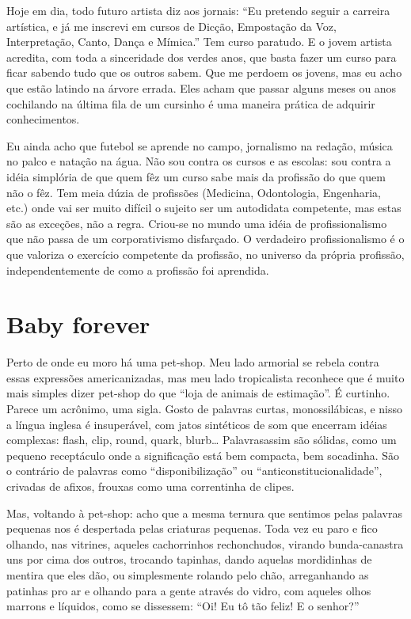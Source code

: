 Hoje em dia, todo futuro artista diz aos jornais: “Eu pretendo seguir
a carreira artística, e já me inscrevi em cursos de Dicção,
Empostação da Voz, Interpretação, Canto, Dança e Mímica.” Tem curso
paratudo. E o jovem artista acredita, com toda a sinceridade dos
verdes anos, que basta fazer um curso para ficar sabendo tudo que os
outros sabem. Que me perdoem os jovens, mas eu acho que estão latindo
na árvore errada. Eles acham que passar alguns meses ou anos
cochilando na última fila de um cursinho é uma maneira prática de
adquirir conhecimentos.

Eu ainda acho que futebol se aprende no campo, jornalismo na redação,
música no palco e natação na água. Não sou contra os cursos e as
escolas: sou contra a idéia simplória de que quem fêz um curso sabe
mais da profissão do que quem não o fêz.  Tem meia dúzia de
profissões (Medicina, Odontologia, Engenharia, etc.) onde vai ser
muito difícil o sujeito ser um autodidata competente, mas estas são
as exceções, não a regra. Criou-se no mundo uma idéia de
profissionalismo que não passa de um corporativismo disfarçado. O
verdadeiro profissionalismo é o que valoriza o exercício competente
da profissão, no universo da própria profissão, independentemente de
como a profissão foi aprendida.

\chapter{Baby forever}

Perto de onde eu moro há uma pet-shop. Meu lado armorial se rebela
contra essas expressões americanizadas, mas meu lado tropicalista
reconhece que é muito mais simples dizer pet-shop do que “loja de
animais de estimação”. É curtinho. Parece um acrônimo, uma sigla.
Gosto de palavras curtas, monossilábicas, e nisso a língua inglesa é
insuperável, com jatos sintéticos de som que encerram idéias
complexas: flash, clip, round, quark, blurb… Palavrasassim são
sólidas, como um pequeno receptáculo onde a significação está bem
compacta, bem socadinha. São o contrário de palavras como
“disponibilização” ou “anticonstitucionalidade”, crivadas de afixos,
frouxas como uma correntinha de clipes.

Mas, voltando à pet-shop: acho que a mesma ternura que sentimos pelas
palavras pequenas nos é despertada pelas criaturas pequenas. Toda vez
eu paro e fico olhando, nas vitrines, aqueles cachorrinhos
rechonchudos, virando bunda-canastra uns por cima dos outros,
trocando tapinhas, dando aquelas mordidinhas de mentira que eles dão,
ou simplesmente rolando pelo chão, arreganhando as patinhas pro ar e
olhando para a gente através do vidro, com aqueles olhos marrons e
líquidos, como se dissessem: “Oi! Eu tô tão feliz! E o senhor?”

